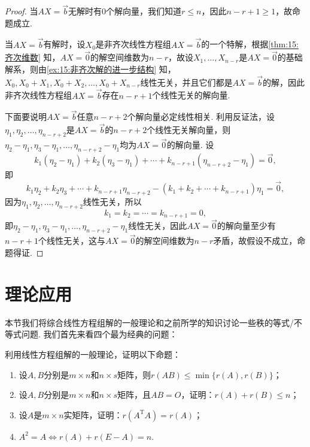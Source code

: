 \begin{proof}
    当$AX=\vec{b}$无解时有0个解向量，我们知道$r\leqslant n$，因此$n-r+1\geqslant 1$，故命题成立.

    当$AX=\vec{b}$有解时，设$X_0$是非齐次线性方程组$AX=\vec{b}$的一个特解，根据\autoref{thm:15:齐次维数} 知，$AX=\vec{0}$的解空间维数为$n-r$，故设$X_1,\ldots,X_{n-r}$是$AX=\vec{0}$的基础解系，则由\autoref{ex:15:非齐次解的进一步结构} 知，$X_0,X_0+X_1,X_0+X_2,\ldots,X_0+X_{n-r}$线性无关，并且它们都是$AX=\vec{b}$的解，因此非齐次线性方程组$AX=\vec{b}$存在$n-r+1$个线性无关的解向量.

    下面要说明$AX=\vec{b}$任意$n-r+2$个解向量必定线性相关. 利用反证法，设$\eta_1,\eta_2,\ldots,\eta_{n-r+2}$是$AX=\vec{b}$的$n-r+2$个线性无关解向量，则$\eta_2-\eta_1,\eta_3-\eta_1,\ldots,\eta_{n-r+2}-\eta_1$均为$AX=\vec{0}$的解向量. 设
    \[k_1(\eta_2-\eta_1)+k_2(\eta_3-\eta_1)+\cdots+k_{n-r+1}(\eta_{n-r+2}-\eta_1)=\vec{0},\]
    即
    \[k_1\eta_2+k_2\eta_3+\cdots+k_{n-r+1}\eta_{n-r+2}-(k_1+k_2+\cdots+k_{n-r+1})\eta_1=\vec{0},\]
    因为$\eta_1,\eta_2,\ldots,\eta_{n-r+2}$线性无关，所以
    \[k_1=k_2=\cdots=k_{n-r+1}=0,\]
    即$\eta_2-\eta_1,\eta_3-\eta_1,\ldots,\eta_{n-r+2}-\eta_1$线性无关，因此$AX=\vec{0}$的解向量至少有$n-r+1$个线性无关，这与$AX=\vec{0}$的解空间维数为$n-r$矛盾，故假设不成立，命题得证.
\end{proof}

\section{理论应用}

本节我们将综合线性方程组解的一般理论和之前所学的知识讨论一些秩的等式/不等式问题. 我们首先来看四个最为经典的问题：
\begin{example}\label{ex:15:线性方程组理论与秩不等式}
    利用线性方程组解的一般理论，证明以下命题：
    \begin{enumerate}
        \item  设$A,B$分别是$m \times n$和$n \times s$矩阵，则$r(AB)\leqslant\min\{r(A),r(B)\}$；

        \item 设$A,B$分别是$m \times n$和$n \times s$矩阵，且$AB=O$，证明：$r(A)+r(B)\leqslant n$；

        \item 设$A$是$m \times n$实矩阵，证明：$r(A^\mathrm{T}A)=r(A)$；

        \item $A^2=A \iff r(A)+r(E-A)=n$.
    \end{enumerate}
\end{example}

